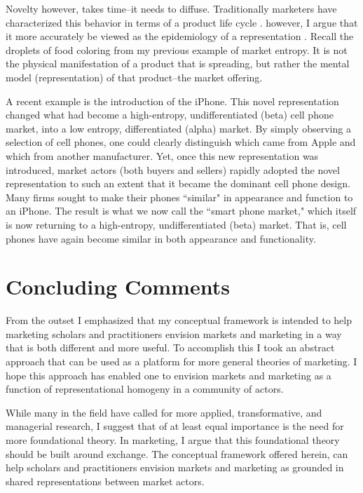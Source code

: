 Novelty however, takes time--it needs to diffuse. Traditionally marketers have characterized this behavior in terms of a product life cycle \citep{gardner1987}. however, I argue that it more accurately be viewed as the epidemiology of a representation \citep{sperber1985}. Recall the droplets of food coloring from my previous example of market entropy. It is not the physical manifestation of a product that is spreading, but rather the mental model (representation) of that product--the market offering. 

A recent example is the introduction of the iPhone. This novel representation changed what had become a high-entropy, undifferentiated (beta) cell phone market, into a low entropy, differentiated (alpha) market. By simply observing a selection of cell phones, one could clearly distinguish which came from Apple and which from another manufacturer. Yet, once this new representation was introduced, market actors (both buyers and sellers) rapidly adopted the novel representation to such an extent that it became the dominant cell phone design. Many firms sought to make their phones ``similar" in appearance and function to an iPhone. The result is what we now call the ``smart phone market," which itself is now returning to a high-entropy, undifferentiated (beta) market. That is, cell phones have again become similar in both appearance and functionality.

\section{Concluding Comments}
From the outset I emphasized that my conceptual framework is intended to help marketing scholars and practitioners envision markets and marketing in a way that is both different and more useful. To accomplish this I took an abstract approach that can be used as a platform for more general theories of marketing. I hope this approach has enabled one to envision markets and marketing as a function of representational homogeny in a community of actors. 

While many in the field have called for more applied, transformative, and managerial research, I suggest that of at least equal importance is the need for more foundational theory. In marketing, I argue that this foundational theory should be built around exchange. The conceptual framework offered herein, can help scholars and practitioners envision markets and marketing as grounded in shared representations between market actors. 
	
